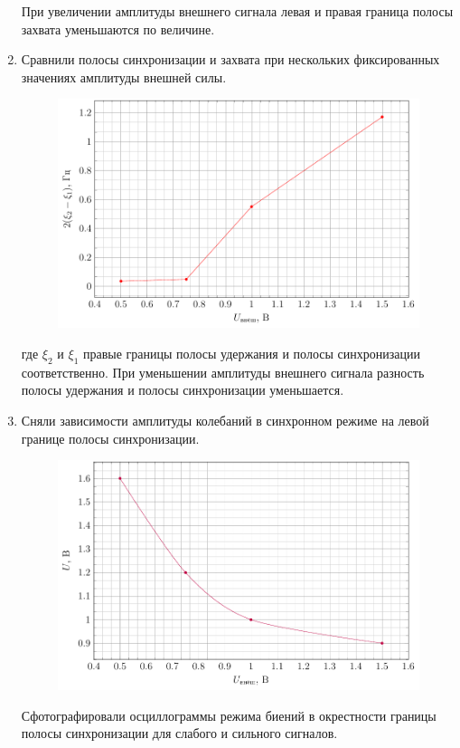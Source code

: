 \documentclass[a4paper,14pt]{extarticle}
\begin{document}
\begin{enumerate}
\begin{figure}[H]
 	\end{figure}
 При увеличении амплитуды внешнего сигнала левая и правая граница полосы захвата уменьшаются по величине.
 	\item 
 	Сравнили полосы синхронизации и захвата при нескольких фиксированных значениях амплитуды внешней силы. 
  	\begin{figure}[H]
	\centering
	\includegraphics[width=0.8\linewidth]{plots/fig5}
 	\end{figure}
 где $\xi_2$ и $\xi_1$ правые границы полосы удержания и полосы синхронизации соответственно.
 При уменьшении амплитуды внешнего сигнала разность полосы удержания и полосы синхронизации уменьшается.
 	\item 
 	Сняли зависимости амплитуды колебаний в синхронном режиме на левой границе полосы синхронизации. 
 	\begin{figure}[H]
 		\centering
 		\includegraphics[width=0.8\linewidth]{plots/fig6}
 	\end{figure}
 Сфотографировали осциллограммы режима биений в окрестности границы полосы синхронизации для слабого и сильного сигналов.
 \begin{figure}[H]
 	\centering

\end{figure}
\end{enumerate}
\end{document}
